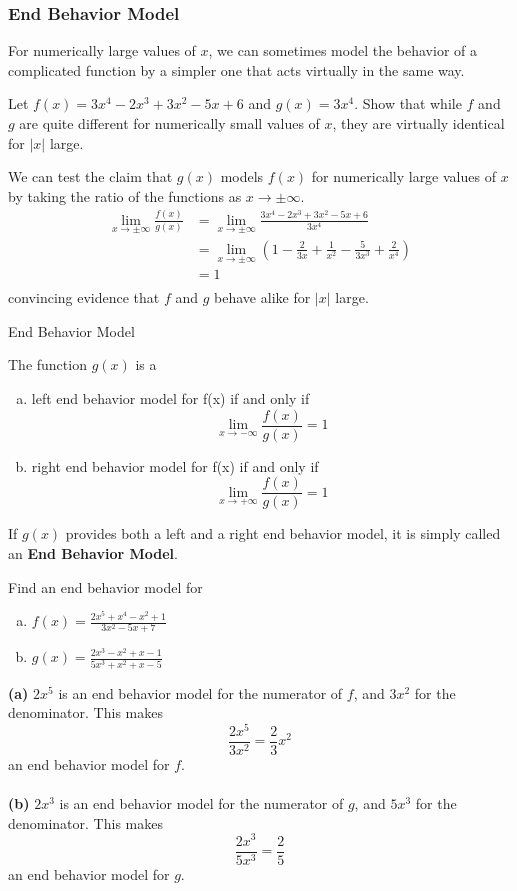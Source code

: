 \subsubsection{End Behavior Model}
For numerically large values of $x$, we can sometimes model the behavior of a complicated function by a simpler one that acts virtually in the same way.

\begin{example}{Let $f(x) = 3x^4 - 2x^3 + 3x^2 - 5x + 6$ and $g(x) = 3x^4$. Show that while $f$ and $g$ are quite different for numerically small values of $x$, they are virtually identical for $|x|$ large.}
    
    We can test the claim that $g(x)$ models $f(x)$ for numerically large values of $x$ by taking the ratio of the functions as $x \to \pm \infty$. \\
    \begin{align*}
        \lim_{x \to \pm\infty} \frac{f(x)}{g(x)} &= \lim_{x \to \pm\infty} \frac{3x^4-2x^3+3x^2-5x+6}{3x^4} \\
        &= \lim_{x \to \pm\infty} \left( 1 - \frac{2}{3x} + \frac{1}{x^2} - \frac{5}{3x^3} + \frac{2}{x^4} \right)  \\
        &= 1 \\
    \end{align*}
    convincing evidence that $f$ and $g$ behave alike for $|x|$ large.
\end{example}

\begin{definition}{End Behavior Model}

    The function $g(x)$ is a
    \begin{enumerate}[(a)]
        \item left end behavior model for f(x) if and only if \[ \lim_{x \to -\infty} \frac{f(x)}{g(x)} = 1 \]
        \item right end behavior model for f(x) if and only if \[ \lim_{x \to +\infty} \frac{f(x)}{g(x)} = 1 \]
    \end{enumerate}
    If $g(x)$ provides both a left and a right end behavior model, it is simply called an \textbf{End Behavior Model}.
\end{definition}

\begin{example}{Find an end behavior model for
    \begin{enumerate}[(a)]
        \item $f(x) = \frac{2x^5+x^4-x^2+1}{3x^2-5x+7}$
        \item $g(x) = \frac{2x^3-x^2+x-1}{5x^3+x^2+x-5}$
    \end{enumerate}}
    
    \textbf{(a)} $2x^5$ is an end behavior model for the numerator of $f$, and $3x^2$ for the denominator. This makes \[
        \frac{2x^5}{3x^2} = \frac{2}{3}x^2
    \] an end behavior model for $f$. \\~\\
    \textbf{(b)} $2x^3$ is an end behavior model for the numerator of $g$, and $5x^3$ for the denominator. This makes \[
        \frac{2x^3}{5x^3} = \frac{2}{5}
    \] an end behavior model for $g$.
\end{example}

